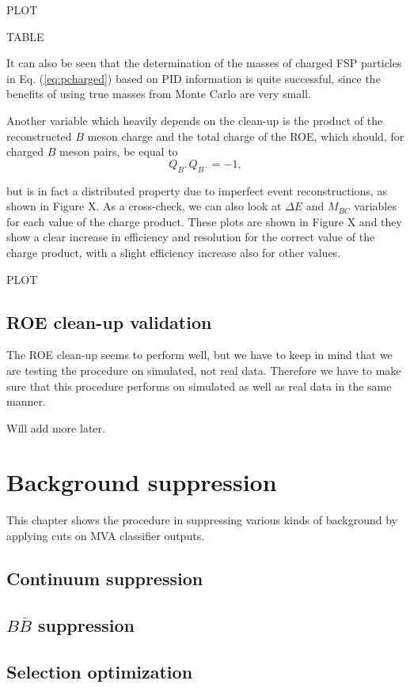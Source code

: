 \documentclass[oneside,a4paper,openany,12pt]{scrbook}
\begin{document}
PLOT 

TABLE

It can also be seen that the determination of the masses of charged FSP particles in Eq. (\ref{eq:pcharged}) based on PID information is quite successful, since the benefits of using true masses from Monte Carlo are very small.

Another variable which heavily depends on the clean-up is the product of the reconstructed $B$ meson charge and the total charge of the ROE, which should, for charged $B$ meson pairs, be equal to 
\begin{equation}
Q_{B^+} Q_{B^-} = -1,
\end{equation}

but is in fact a distributed property due to imperfect event reconstructions, as shown in Figure X. As a cross-check, we can also look at $\Delta E$ and $M_{BC}$ variables for each value of the charge product. These plots are shown in Figure X and they show a clear increase in efficiency and resolution for the correct value of the charge product, with a slight efficiency increase also for other values.

PLOT


\section{ROE clean-up validation}

The ROE clean-up seems to perform well, but we have to keep in mind that we are testing the procedure on simulated, not real data. Therefore we have to make sure that this procedure performs on simulated as well as real data in the same manner.

Will add more later.

\chapter{Background suppression}

This chapter shows the procedure in suppressing various kinds of background by applying cuts on MVA classifier outputs. 


\section{Continuum suppression}
\section{$B\bar B$ suppression}
\section{Selection optimization}
\end{document}
